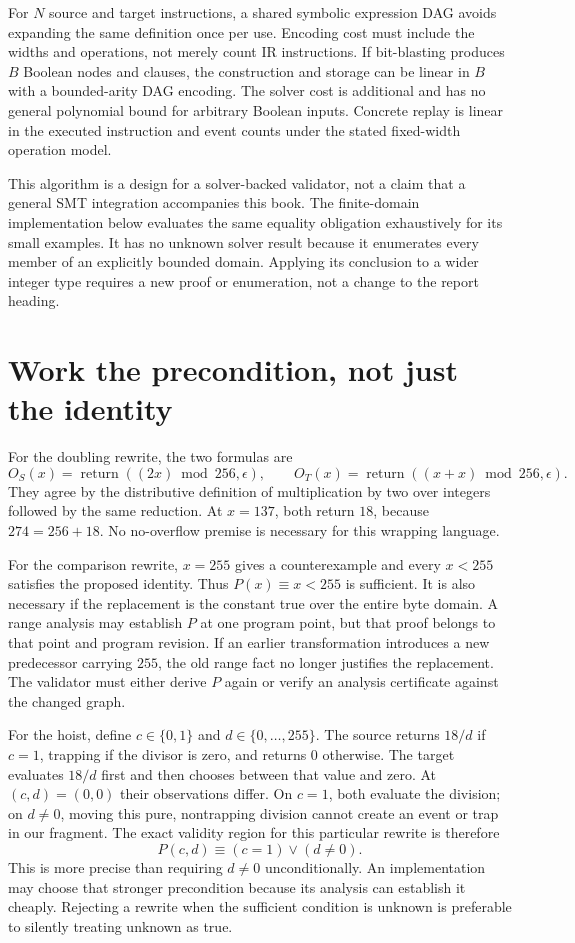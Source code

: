 For $N$ source and target instructions, a shared symbolic expression DAG avoids expanding the same definition once per use.
Encoding cost must include the widths and operations, not merely count IR instructions.
If bit-blasting produces $B$ Boolean nodes and clauses, the construction and storage can be linear in $B$ with a bounded-arity DAG encoding.
The solver cost is additional and has no general polynomial bound for arbitrary Boolean inputs.
Concrete replay is linear in the executed instruction and event counts under the stated fixed-width operation model.

This algorithm is a design for a solver-backed validator, not a claim that a general SMT integration accompanies this book.
The finite-domain implementation below evaluates the same equality obligation exhaustively for its small examples.
It has no unknown solver result because it enumerates every member of an explicitly bounded domain.
Applying its conclusion to a wider integer type requires a new proof or enumeration, not a change to the report heading.

\section{Work the precondition, not just the identity}
\label{sec:ch47-worked}

For the doubling rewrite, the two formulas are
\[
  O_S(x)=\operatorname{return}((2x)\bmod256,\epsilon),\qquad
  O_T(x)=\operatorname{return}((x+x)\bmod256,\epsilon).
\]
They agree by the distributive definition of multiplication by two over integers followed by the same reduction.
At $x=137$, both return $18$, because $274=256+18$.
No no-overflow premise is necessary for this wrapping language.

For the comparison rewrite, $x=255$ gives a counterexample and every $x<255$ satisfies the proposed identity.
Thus $P(x)\equiv x<255$ is sufficient.
It is also necessary if the replacement is the constant true over the entire byte domain.
A range analysis may establish $P$ at one program point, but that proof belongs to that point and program revision.
If an earlier transformation introduces a new predecessor carrying $255$, the old range fact no longer justifies the replacement.
The validator must either derive $P$ again or verify an analysis certificate against the changed graph.

For the hoist, define $c\in\{0,1\}$ and $d\in\{0,\ldots,255\}$.
The source returns $18/d$ if $c=1$, trapping if the divisor is zero, and returns $0$ otherwise.
The target evaluates $18/d$ first and then chooses between that value and zero.
At $(c,d)=(0,0)$ their observations differ.
On $c=1$, both evaluate the division; on $d\neq0$, moving this pure, nontrapping division cannot create an event or trap in our fragment.
The exact validity region for this particular rewrite is therefore
\[
  P(c,d)\equiv(c=1)\lor(d\neq0).
\]
This is more precise than requiring $d\neq0$ unconditionally.
An implementation may choose that stronger precondition because its analysis can establish it cheaply.
Rejecting a rewrite when the sufficient condition is unknown is preferable to silently treating unknown as true.

